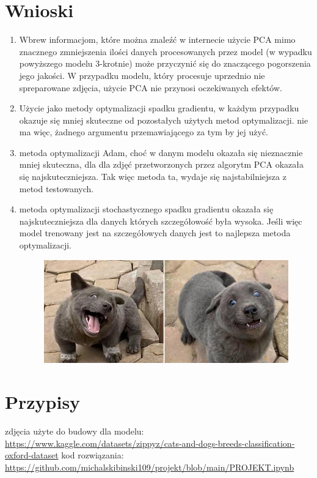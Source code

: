 \documentclass[a4paper,12pt]{scrartcl}
\begin{document}
\section{Wnioski}
\begin{enumerate}
  \item Wbrew informacjom, które można znaleźć w internecie użycie PCA mimo znacznego 
  zmniejszenia ilości danych procesowanych przez model 
  (w wypadku powyższego modelu 3-krotnie)
  może przyczynić się do znaczącego pogorszenia jego jakości. 
  W przypadku modelu, który procesuje uprzednio nie spreparowane zdjęcia, 
  użycie PCA nie przynosi oczekiwanych efektów.
  \item Użycie jako metody optymalizacji spadku gradientu, w każdym przypadku okazuje się mniej skuteczne od pozostałych użytych metod optymalizacji.
  nie ma więc, żadnego argumentu przemawiającego za tym by jej użyć.
  \item metoda optymalizacji Adam, choć w danym modelu okazała się nieznacznie mniej skuteczna, dla 
  dla zdjęć przetworzonych przez algorytm PCA okazała się najskuteczniejsza. Tak więc metoda ta, 
  wydaje się najstabilniejsza z metod testowanych.
  \item metoda optymalizacji stochastycznego spadku gradientu okazała 
  się najskuteczniejsza dla danych których szczegółowość była wysoka. 
  Jeśli więc model trenowany jest na szczegółowych danych jest to najlepsza metoda optymalizacji.
  \begin{figure}[h]
    \includegraphics[width=\linewidth]{example.png}
  \end{figure}
\end{enumerate} 
\section{Przypisy}
zdjęcia użyte do budowy dla modelu:\\ 
\href{https://www.kaggle.com/datasets/zippyz/cats-and-dogs-breeds-classification-oxford-dataset}
{https://www.kaggle.com/datasets/zippyz/cats-and-dogs-breeds-classification-oxford-dataset}
kod rozwiązania:\\
\href{https://github.com/michalskibinski109/projekt/blob/main/PROJEKT.ipynb}
{https://github.com/michalskibinski109/projekt/blob/main/PROJEKT.ipynb}
\end{document}
